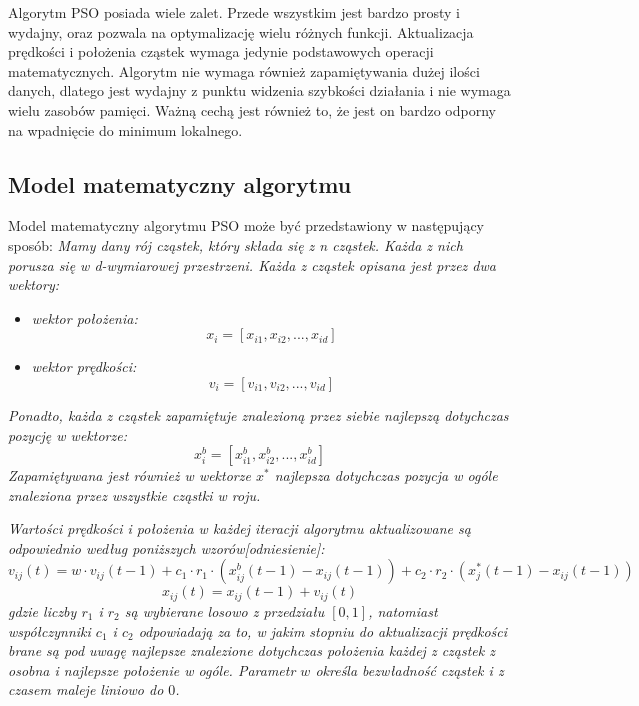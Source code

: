 Algorytm PSO posiada wiele zalet. Przede wszystkim jest bardzo prosty i wydajny, oraz pozwala na optymalizację wielu różnych funkcji. Aktualizacja prędkości i położenia cząstek wymaga jedynie podstawowych operacji matematycznych. Algorytm nie wymaga również zapamiętywania dużej ilości danych, dlatego jest wydajny z punktu widzenia szybkości działania i nie wymaga wielu zasobów pamięci. Ważną cechą jest również to, że jest on bardzo odporny na wpadnięcie do minimum lokalnego.

\subsection{Model matematyczny algorytmu}
Model matematyczny algorytmu PSO może być przedstawiony w następujący sposób:
\textit{Mamy dany rój cząstek, który składa się z n cząstek. Każda z nich porusza się w d-wymiarowej przestrzeni. Każda z cząstek opisana jest przez dwa wektory:}

\begin{itemize}
\item\textit{wektor położenia:}
\newline
\begin{equation}
x_i = [x_{i1},x_{i2},...,x_{id}]
\end{equation}
\newline
\item\textit{wektor prędkości:}
\newline
\begin{equation}
v_i = [v_{i1},v_{i2},...,v_{id}]
\end{equation}
\newline
\end{itemize}

\textit{Ponadto, każda z cząstek zapamiętuje znalezioną przez siebie najlepszą dotychczas pozycję w wektorze:}
\newline
\begin{equation}
x_i^b=[x_{i1}^b,x_{i2}^b,...,x_{id}^b]
\end{equation} 
\newline
\textit{Zapamiętywana jest również w wektorze $x^*$ najlepsza dotychczas pozycja w ogóle znaleziona przez wszystkie cząstki w roju.}

\textit{Wartości prędkości i położenia w każdej iteracji algorytmu aktualizowane są odpowiednio według poniższych wzorów[odniesienie]:}
\newline
\begin{equation}
v_{ij}(t)=w \cdot v_{ij}(t-1)+c_1\cdot r_1 \cdot (x_{ij}^b(t-1)-x_{ij}(t-1))+c_2 \cdot r_2 \cdot (x_j^*(t-1)-x_{ij}(t-1))
\end{equation}
\newline
\begin{equation}
x_{ij}(t)=x_{ij}(t-1)+v_{ij}(t)
\end{equation}
\newline
\textit{gdzie liczby $r_1$ i $r_2$ są wybierane losowo z przedziału $[0,1]$, natomiast współczynniki $c_1$ i $c_2$ odpowiadają za to, w jakim stopniu do aktualizacji prędkości brane są pod uwagę najlepsze znalezione dotychczas położenia każdej z cząstek z osobna i najlepsze położenie w ogóle. Parametr $w$ określa bezwładność cząstek i z czasem maleje liniowo do $0$.}

